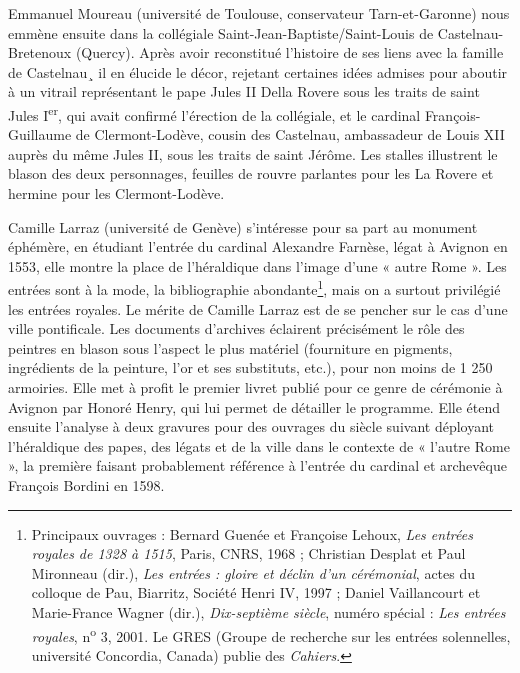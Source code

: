 \documentclass[12pt,twoside,openany]{book}
\begin{document}
Emmanuel Moureau (université de Toulouse, conservateur Tarn-et-Garonne) nous emmène ensuite dans la collégiale Saint-Jean-Baptiste/Saint-Louis de Castelnau-Bretenoux (Quercy). Après avoir reconstitué l’histoire de ses liens avec la famille de Castelnau¸ il en élucide le décor, rejetant certaines idées admises pour aboutir à un vitrail représentant le pape Jules II Della Rovere sous les traits de saint Jules I\textsuperscript{er}, qui avait confirmé l’érection de la collégiale, et le cardinal François-Guillaume de Clermont-Lodève, cousin des Castelnau, ambassadeur de Louis XII auprès du même Jules II, sous les traits de saint Jérôme. Les stalles illustrent le blason des deux personnages, feuilles de rouvre parlantes pour les La Rovere et hermine pour les Clermont-Lodève.

Camille Larraz (université de Genève) s’intéresse pour sa part au monument éphémère, en étudiant l’entrée du cardinal Alexandre Farnèse, légat à Avignon en 1553, elle montre la place de l’héraldique dans l’image d’une « autre Rome ». Les entrées sont à la mode, la bibliographie abondante\footnote{Principaux ouvrages : Bernard Guenée et Françoise Lehoux, \textit{Les entrées royales de 1328 à 1515}, Paris, CNRS, 1968 ; Christian Desplat et Paul Mironneau (dir.), \textit{Les entrées : gloire et déclin d’un cérémonial}, actes du colloque de Pau, Biarritz, Société Henri IV, 1997 ; Daniel Vaillancourt et Marie-France Wagner (dir.), \textit{Dix-septième siècle}, numéro spécial : \textit{Les entrées royales}, n\textsuperscript{o} 3, 2001. Le GRES (Groupe de recherche sur les entrées solennelles, université Concordia, Canada) publie des \textit{Cahiers}.}, mais on a surtout privilégié les entrées royales. Le mérite de Camille Larraz est de se pencher sur le cas d’une ville pontificale. Les documents d’archives éclairent précisément le rôle des peintres en blason sous l’aspect le plus matériel (fourniture en pigments, ingrédients de la peinture, l’or et ses substituts, etc.), pour non moins de 1 250 armoiries. Elle met à profit le premier livret publié pour ce genre de cérémonie à Avignon par Honoré Henry, qui lui permet de détailler le programme. Elle étend ensuite l’analyse à deux gravures pour des ouvrages du siècle suivant déployant l’héraldique des papes, des légats et de la ville dans le contexte de « l’autre Rome », la première faisant probablement référence à l’entrée du cardinal et archevêque François Bordini en 1598.
\end{document}
